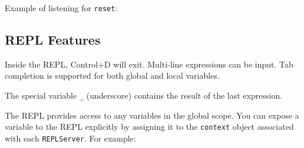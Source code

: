 Example of listening for \texttt{reset}:

\begin{Shaded}
\begin{Highlighting}[]
\NormalTok{(\{ } 
\NormalTok{(}\NormalTok{);}

\NormalTok{(}\NormalTok{, } 
  \NormalTok{(}\NormalTok{);}
\NormalTok{\});}
\end{Highlighting}
\end{Shaded}

\subsection{REPL Features}\label{repl-features}

Inside the REPL, Control+D will exit. Multi-line expressions can be
input. Tab completion is supported for both global and local variables.

The special variable \texttt{\_} (underscore) contains the result of the
last expression.

\begin{Shaded}
\begin{Highlighting}[]
\NormalTok{> [ }\NormalTok{, }\NormalTok{, } \NormalTok{]}
\NormalTok{[ }\NormalTok{, }\NormalTok{, } \NormalTok{]}
\NormalTok{> }\OtherTok{_}
\NormalTok{> _ += }
\end{Highlighting}
\end{Shaded}

The REPL provides access to any variables in the global scope. You can
expose a variable to the REPL explicitly by assigning it to the
\texttt{context} object associated with each \texttt{REPLServer}. For
example:

\begin{Shaded}
\begin{Highlighting}[]
 \NormalTok{(}\NormalTok{),}
    \NormalTok{;}

\NormalTok{(} 
\end{Highlighting}
\end{Shaded}

